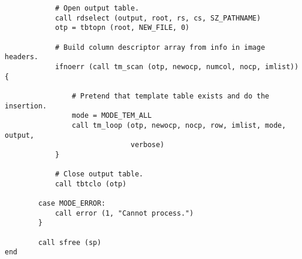 \begin{verbatim}
            # Open output table.
            call rdselect (output, root, rs, cs, SZ_PATHNAME)
            otp = tbtopn (root, NEW_FILE, 0)

            # Build column descriptor array from info in image headers.
            ifnoerr (call tm_scan (otp, newocp, numcol, nocp, imlist)) {

                # Pretend that template table exists and do the insertion. 
                mode = MODE_TEM_ALL
                call tm_loop (otp, newocp, nocp, row, imlist, mode, output,
                              verbose)
            }

            # Close output table.
            call tbtclo (otp)

        case MODE_ERROR:
            call error (1, "Cannot process.")
        }

        call sfree (sp)
end
\end{verbatim}
\newpage
{}
